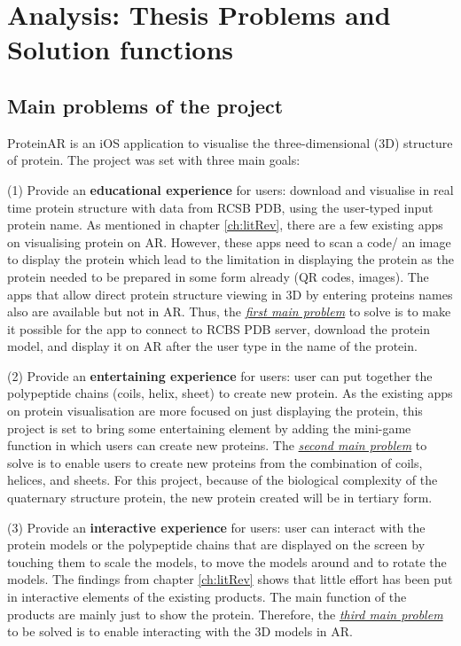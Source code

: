 \chapter{Analysis: Thesis Problems and Solution functions}
\label{ch:analysis2}

\section{Main problems of the project}
ProteinAR is an iOS application to visualise the three-dimensional (3D) structure of protein. The project was set with three main goals:

(1) Provide an \textbf{educational experience} for users: download and visualise in real time protein structure with data from RCSB PDB, using the user-typed input protein name. As mentioned in chapter \ref{ch:litRev}, there are a few existing apps on visualising protein on AR. However, these apps need to scan a code/ an image to display the protein which lead to the limitation in displaying the protein as the protein needed to be prepared in some form already (QR codes, images). The apps that allow direct protein structure viewing in 3D by entering proteins names also are available but not in AR. 
Thus, the \emph{\underline{first main problem}} to solve is to make it possible for the app to connect to RCBS PDB server, download the protein model, and display it on AR after the user type in the name of the protein. 

(2) Provide an \textbf{entertaining experience} for users: user can put together the polypeptide chains (coils, helix, sheet) to create new protein. As the existing apps on protein visualisation are more focused on just displaying the protein, this project is set to bring some entertaining element by adding the mini-game function in which users can create new proteins. 
The \emph{\underline{second main problem}} to solve is to enable users to create new proteins from the combination of coils, helices, and sheets. For this project, because of the biological complexity of the quaternary structure protein, the new protein created will be in tertiary form. 

(3) Provide an \textbf{interactive experience} for users: user can interact with the protein models or the polypeptide chains that are displayed on the screen by touching them to scale the models, to move the models around and to rotate the models. The findings from chapter \ref{ch:litRev} shows that little effort has been put in interactive elements of the existing products. The main function of the products are mainly just to show the protein. Therefore, the  \emph{\underline{third main problem}} to be solved is to enable interacting with the 3D models in AR.

